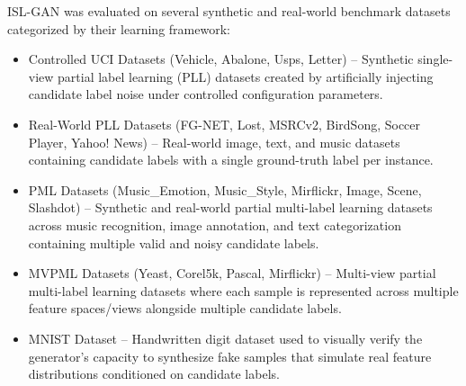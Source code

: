 \documentclass[12pt,a4paper]{article}
\begin{document}
ISL-GAN was evaluated on several synthetic and real-world benchmark datasets categorized by their learning framework:
\begin{itemize}
    \item Controlled UCI Datasets (Vehicle, Abalone, Usps, Letter) – Synthetic single-view partial label learning (PLL) datasets created by artificially injecting candidate label noise under controlled configuration parameters.
    \item Real-World PLL Datasets (FG-NET, Lost, MSRCv2, BirdSong, Soccer Player, Yahoo! News) – Real-world image, text, and music datasets containing candidate labels with a single ground-truth label per instance.
    \item PML Datasets (Music\_Emotion, Music\_Style, Mirflickr, Image, Scene, Slashdot) – Synthetic and real-world partial multi-label learning datasets across music recognition, image annotation, and text categorization containing multiple valid and noisy candidate labels.
    \item MVPML Datasets (Yeast, Corel5k, Pascal, Mirflickr) – Multi-view partial multi-label learning datasets where each sample is represented across multiple feature spaces/views alongside multiple candidate labels.
    \item MNIST Dataset – Handwritten digit dataset used to visually verify the generator's capacity to synthesize fake samples that simulate real feature distributions conditioned on candidate labels.
    \end{itemize}
\end{document}
